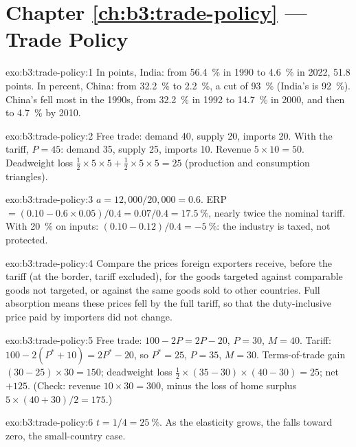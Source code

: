 \section*{Chapter \ref{ch:b3:trade-policy} --- Trade Policy}

\begin{solution}{exo:b3:trade-policy:1}
In points, India: from 56.4~\% in 1990 to 4.6~\% in 2022, 51.8 points. In percent,
China: from 32.2~\% to 2.2~\%, a cut of 93~\% (India's is 92~\%). %
China's fell most in the 1990s, from 32.2~\% in 1992 to 14.7~\% in 2000, and then to
4.7~\% by 2010. %
\end{solution}

\begin{solution}{exo:b3:trade-policy:2}
Free trade: demand 40, supply 20, imports 20. With the tariff, $P = 45$: demand 35,
supply 25, imports 10. Revenue $5 \times 10 = 50$. Deadweight loss $\tfrac12 \times 5 \times 5 +
\tfrac12 \times 5 \times 5 = 25$ (production and consumption triangles).
\end{solution}

\begin{solution}{exo:b3:trade-policy:3}
$a = 12{,}000/20{,}000 = 0.6$. ERP $= (0.10 - 0.6 \times 0.05)/0.4 = 0.07/0.4 = 17.5~\%$, nearly
twice the nominal tariff. With 20~\% on inputs: $(0.10 - 0.12)/0.4 = -5~\%$: the industry is
taxed, not protected.
\end{solution}

\begin{solution}{exo:b3:trade-policy:4}
Compare the prices foreign exporters receive, before the tariff (at the border,
tariff excluded), for the goods targeted against comparable goods not targeted, or
against the same goods sold to other countries. Full absorption means these
prices fell by the full tariff, so that the duty-inclusive price paid by importers
did not change.
\end{solution}

\begin{solution}{exo:b3:trade-policy:5}
Free trade: $100 - 2P = 2P - 20$, $P = 30$, $M = 40$. Tariff: $100 - 2(P^* + 10) = 2P^* - 20$,
so $P^* = 25$, $P = 35$, $M = 30$. Terms-of-trade gain $(30 - 25) \times 30 = 150$; deadweight
loss $\tfrac12 \times (35 - 30) \times (40 - 30) = 25$; net $+125$. (Check: revenue $10 \times 30 = 300$,
minus the loss of home surplus $5 \times (40 + 30)/2 = 175$.)
\end{solution}

\begin{solution}{exo:b3:trade-policy:6}
$t = 1/4 = 25~\%$. As the elasticity grows, the  falls toward zero, the
small-country case.
\end{solution}

